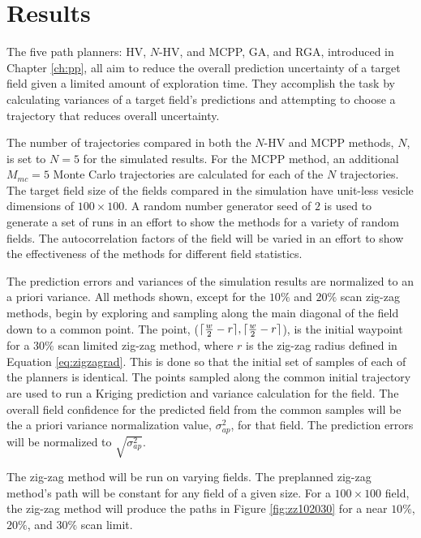 \chapter{Results}
The five path planners: HV, $N$-HV, and MCPP, GA, and RGA, introduced in Chapter \ref{ch:pp}, all aim to reduce the overall prediction uncertainty of a target field given a limited amount of exploration time. They accomplish the task by calculating variances of a target field's predictions and attempting to choose a trajectory that reduces overall uncertainty. 

The number of trajectories compared in both the $N$-HV and MCPP methods, $N$, is set to $N=5$ for the simulated results. For the MCPP method, an additional $M_{mc}=5$ Monte Carlo trajectories are calculated for each of the $N$ trajectories. The target field size of the fields compared in the simulation have unit-less vesicle dimensions of $100\times 100$. A random number generator seed of $2$ is used to generate a set of runs in an effort to show the methods for a variety of random fields. The autocorrelation factors of the field will be varied in an effort to show the effectiveness of the methods for different field statistics.

The prediction errors and variances of the simulation results are normalized to an a priori variance. All methods shown, except for the $10\%$ and $20\%$ scan zig-zag methods, begin by exploring and sampling along the main diagonal of the field down to a common point. The point, ($\Large\lceil\frac{w}{2} - r \Large\rceil, \Large\lceil \frac{w}{2} - r \Large\rceil$), is the initial waypoint for a $30\%$ scan limited zig-zag method, where $r$ is the zig-zag radius defined in Equation \ref{eq:zigzagrad}. This is done so that the initial set of samples of each of the planners is identical. The points sampled along the common initial trajectory are used to run a Kriging prediction and variance calculation for the field. The overall field confidence for the predicted field from the common samples will be the a priori variance normalization value, $\sigma^{2}_{ap}$, for that field. The prediction errors will be normalized to $\sqrt{\sigma^{2}_{ap}}$.

The zig-zag method will be run on varying fields. The preplanned zig-zag method's path will be constant for any field of a given size. For a $100 \times 100$ field, the zig-zag method will produce the paths in Figure \ref{fig:zz102030} for a near $10\%$, $20\%$, and $30\%$ scan limit.

